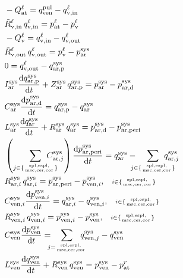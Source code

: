\documentclass[a4paper,12pt]{report}
\begin{document}
\begin{align}
&-Q_{\mathrm{at}}^{\ell} = q_{\mathrm{ven}}^{\mathrm{pul}} - q_{\mathrm{v,in}}^{\ell}\nonumber\\
&\tilde{R}_{\mathrm{v,in}}^{\ell}\,q_{\mathrm{v,in}}^{\ell} = p_{\mathrm{at}}^{\ell}-p_{\mathrm{v}}^{\ell}\nonumber\\
&-Q_{\mathrm{v}}^{\ell} = q_{\mathrm{v,in}}^{\ell} - q_{\mathrm{v,out}}^{\ell}\nonumber\\
&\tilde{R}_{\mathrm{v,out}}^{\ell}\,q_{\mathrm{v,out}}^{\ell} = p_{\mathrm{v}}^{\ell}-p_{\mathrm{ar}}^{\mathrm{sys}}\nonumber\\
&0 = q_{\mathrm{v,out}}^{\ell} - q_{\mathrm{ar,p}}^{\mathrm{sys}}\nonumber\\
&I_{\mathrm{ar}}^{\mathrm{sys}} \frac{\mathrm{d}q_{\mathrm{ar,p}}^{\mathrm{sys}}}{\mathrm{d}t} + Z_{\mathrm{ar}}^{\mathrm{sys}}\,q_{\mathrm{ar,p}}^{\mathrm{sys}}=p_{\mathrm{ar}}^{\mathrm{sys}}-p_{\mathrm{ar,d}}^{\mathrm{sys}}\nonumber\\
&C_{\mathrm{ar}}^{\mathrm{sys}} \frac{\mathrm{d}p_{\mathrm{ar,d}}^{\mathrm{sys}}}{\mathrm{d}t} = q_{\mathrm{ar,p}}^{\mathrm{sys}} - q_{\mathrm{ar}}^{\mathrm{sys}}\nonumber\\
&L_{\mathrm{ar}}^{\mathrm{sys}}\frac{\mathrm{d}q_{\mathrm{ar}}^{\mathrm{sys}}}{\mathrm{d}t} + R_{\mathrm{ar}}^{\mathrm{sys}}\,q_{\mathrm{ar}}^{\mathrm{sys}}=p_{\mathrm{ar,d}}^{\mathrm{sys}} -p_{\mathrm{ar,peri}}^{\mathrm{sys}}\nonumber\\
&\left(\sum_{j\in\{\mathrm{spl,espl,\atop msc,cer,cor}\}}\!\!\!\!\!\!\!\!\!C_{\mathrm{ar},j}^{\mathrm{sys}}\right) \frac{\mathrm{d}p_{\mathrm{ar,peri}}^{\mathrm{sys}}}{\mathrm{d}t} = q_{\mathrm{ar}}^{\mathrm{sys}}-\!\!\!\!\!\sum_{j\in\{\mathrm{spl,espl,\atop msc,cer,cor}\}}\!\!\!\!\!\!\!\!\!q_{\mathrm{ar},j}^{\mathrm{sys}}\nonumber\\
&R_{\mathrm{ar},i}^{\mathrm{sys}}\,q_{\mathrm{ar},i}^{\mathrm{sys}} = p_{\mathrm{ar,peri}}^{\mathrm{sys}} - p_{\mathrm{ven},i}^{\mathrm{sys}}, \quad\scriptstyle{i\in\{\mathrm{spl,espl,\atop msc,cer,cor}\}}\nonumber\\
&C_{\mathrm{ven},i}^{\mathrm{sys}} \frac{\mathrm{d}p_{\mathrm{ven},i}^{\mathrm{sys}}}{\mathrm{d}t} = q_{\mathrm{ar},i}^{\mathrm{sys}} - q_{\mathrm{ven},i}^{\mathrm{sys}}, \quad\scriptstyle{i\in\{\mathrm{spl,espl,\atop msc,cer,cor}\}}\nonumber\\
&R_{\mathrm{ven},i}^{\mathrm{sys}}\,q_{\mathrm{ven},i}^{\mathrm{sys}} = p_{\mathrm{ven},i}^{\mathrm{sys}}-p_{\mathrm{ven}}^{\mathrm{sys}}, \quad\scriptstyle{i\in\{\mathrm{spl,espl,\atop msc,cer,cor}\}}\nonumber\\
&C_{\mathrm{ven}}^{\mathrm{sys}} \frac{\mathrm{d}p_{\mathrm{ven}}^{\mathrm{sys}}}{\mathrm{d}t} = \!\!\!\!\sum_{j=\mathrm{spl,espl,\atop msc,cer,cor}}\!\!\!\!\!q_{\mathrm{ven},j}^{\mathrm{sys}}-q_{\mathrm{ven}}^{\mathrm{sys}}\nonumber\\
&L_{\mathrm{ven}}^{\mathrm{sys}}\frac{\mathrm{d}q_{\mathrm{ven}}^{\mathrm{sys}}}{\mathrm{d}t} + R_{\mathrm{ven}}^{\mathrm{sys}}\, q_{\mathrm{ven}}^{\mathrm{sys}} = p_{\mathrm{ven}}^{\mathrm{sys}} - p_{\mathrm{at}}^{r}\nonumber
\end{align}
\end{document}

